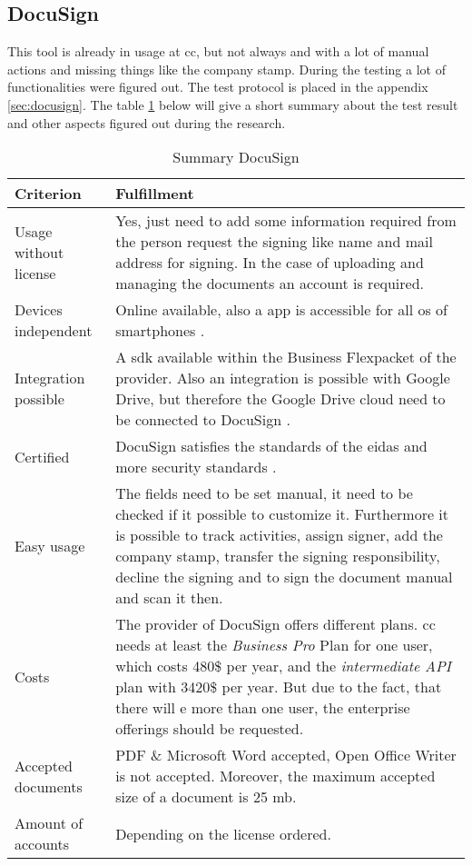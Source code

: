 \subsection{DocuSign}
This tool is already in usage at \gls{cc}, but not always and with a lot of manual actions and missing things like the company stamp. During the testing a lot of functionalities were figured out. The test protocol is placed in the appendix \ref{sec:docusign}. The table \ref{tab:docusign} below will give a short summary about the test result and other aspects figured out during the research.

\begin{table}[h]
	\begin{tabular}{|p{4cm}|p{10cm}|} \hline
		Criterion & Fulfillment \\ \hline
		Usage without license & Yes, just need to add some information required from the person request the signing like name and mail address for signing. In the case of uploading and managing the documents an account is required.\\ \hline
		Devices independent & Online available, also a \gls{app} is accessible for all \gls{os} of smartphones \parencite{docusign2018mobile}. \\ \hline
		Integration possible & A \gls{sdk} available within the \grqq Business Flex\grqq packet of the provider. Also an integration is possible with Google Drive, but therefore the Google Drive cloud need to be connected to DocuSign \parencite{docusign2018integration,docusign2018formats}. \\ \hline
		Certified & DocuSign satisfies the standards of the \gls{eidas} and more security standards \parencite{docusign2018certificates,docusign2018legal}. \\ \hline
		Easy usage & The fields need to be set manual, it need to be checked if it possible to customize it. Furthermore it is possible to track activities, assign signer, add the company stamp, transfer the signing responsibility, decline the signing and to sign the document manual and scan it then. \\ \hline
		Costs & The provider of DocuSign offers different plans. \Gls{cc} needs at least the \textit{Business Pro} Plan for one user, which costs 480\$ per year, and the \textit{intermediate API} plan with 3420\$ per year. But due to the fact, that there will  e more than one user, the enterprise offerings should be requested. \parencite{docusign2018api,docusign2018user} \\ \hline
		Accepted documents & PDF \& Microsoft Word accepted, Open Office Writer is not accepted. Moreover, the maximum accepted size of a document is 25 \gls{mb}. \parencite{docusign2018formats} \\ \hline
		Amount of accounts & Depending on the license ordered.\\ \hline
	\end{tabular}
	\caption{Summary DocuSign}
	\label{tab:docusign}
\end{table}

